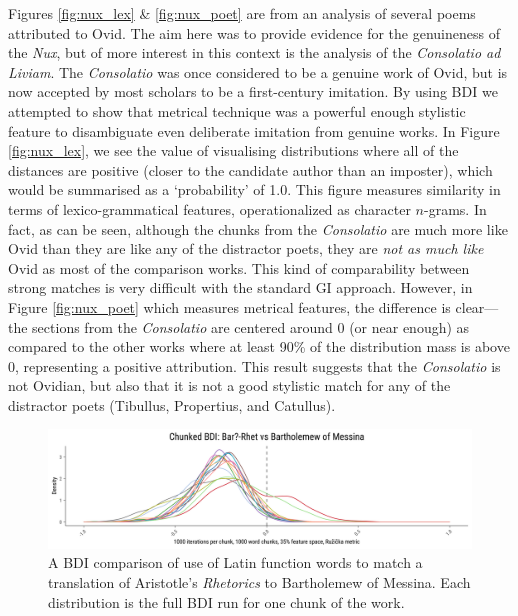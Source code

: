 \documentclass[
    hf
]{ceurart}
\begin{document}
Figures \ref{fig:nux_lex} \& \ref{fig:nux_poet} are from an analysis of several
poems attributed to Ovid. The aim here was to provide evidence for the
genuineness of the \emph{Nux}, but of more interest in this context is the
analysis of the \emph{Consolatio ad Liviam}. The \emph{Consolatio} was once
considered to be a genuine work of Ovid, but is now accepted by most scholars to
be a first-century imitation. By using BDI we attempted to show that metrical
technique was a powerful enough stylistic feature to disambiguate even
deliberate imitation from genuine works. In Figure \ref{fig:nux_lex}, we see the
value of visualising distributions where all of the distances are positive
(closer to the candidate author than an imposter), which would be summarised as
a `probability' of 1.0. This figure measures similarity in terms of
lexico-grammatical features, operationalized as character $n$-grams. In fact, as
can be seen, although the chunks from the \emph{Consolatio} are much more like
Ovid than they are like any of the distractor poets, they are \emph{not as much
    like} Ovid as most of the comparison works. This kind of comparability between
strong matches is very difficult with the standard GI approach. However, in
Figure \ref{fig:nux_poet} which measures metrical features, the difference is
clear---the sections from the \emph{Consolatio} are centered around 0 (or near
enough) as compared to the other works where at least 90\% of the distribution
mass is above 0, representing a positive attribution. This result suggests that
the \emph{Consolatio} is not Ovidian, but also that it is not a good stylistic
match for any of the distractor poets (Tibullus, Propertius, and Catullus).

\begin{figure}
    \includegraphics[width=\linewidth]{figures/bdi_bar_paper.png}
    \caption{A BDI comparison of use of Latin function words to match a
        translation of Aristotle's \emph{Rhetorics} to Bartholemew of Messina. Each
        distribution is the full BDI run for one chunk of the work.}
    \label{fig:trans_bar}
\end{figure}
\end{document}
